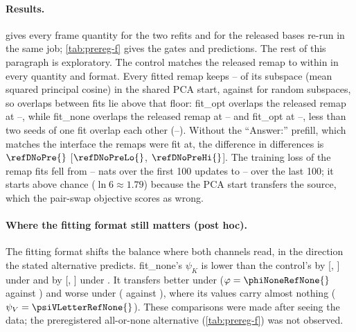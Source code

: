 \paragraph{Results.}  gives every frame quantity for the two refits and for the released bases re-run in the same job; \cref{tab:prereg-f} gives the gates and predictions. The rest of this paragraph is exploratory. The control matches the released remap to within  in every quantity and format. Every fitted remap keeps -- of its subspace (mean squared principal cosine) in the shared PCA start, against  for random subspaces, so overlaps between fits lie above that floor: fit\_opt overlaps the released remap at --, while fit\_none overlaps the released remap at -- and fit\_opt at --, less than two seeds of one fit overlap each other (--). Without the ``Answer:'' prefill, which matches the interface the remaps were fit at, the difference in differences is $\refDNoPre{}$ [$\refDNoPreLo{}$, $\refDNoPreHi{}$]. The training loss of the remap fits fell from -- nats over the first 100 updates to -- over the last 100; it starts above chance ($\ln 6 \approx 1.79$) because the PCA start transfers the source, which the pair-swap objective scores as wrong.

\paragraph{Where the fitting format still matters (post hoc).} The fitting format shifts the balance where both channels read, in the direction the stated alternative predicts. fit\_none's $\psi_K$ is lower than the control's by  [, ] under \fmtOpt{} and by  [, ] under \fmtPost{}. It transfers better under \fmtNone{} ($\varphi = \phiNoneRefNone{}$ against \phiNoneRefOpt{}) and worse under \fmtLetter{} (\phiLetterRefNone{} against \phiLetterRefOpt{}), where its values carry almost nothing ($\psi_V = \psiVLetterRefNone{}$). These comparisons were made after seeing the data; the preregistered all-or-none alternative (\cref{tab:prereg-f}) was not observed.

\begin{table}[!ht]
\centering
\footnotesize
\caption{\textbf{Refit remaps in the frames of \citet{anonymous2026fitted}} (Mistral-Small-24B, ``Answer:'' prefill). fit\_none: refit under \fmtNone{}; fit\_opt: refit under \fmtOpt{} with the same code; released: the released bases, re-run in the same job. All fits share one PCA control P. $n = 96$ cores, three fits averaged within core; 95\% core bootstrap.}
\label{tab:refit}
{\setlength{\tabcolsep}{4pt}}
\end{table}

